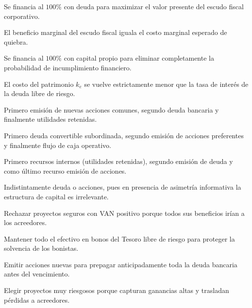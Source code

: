 \begin{opts}
    \item Se financia al $100\%$ con deuda para maximizar el valor presente del escudo fiscal corporativo.
    \item El beneficio marginal del escudo fiscal iguala el costo marginal esperado de quiebra.
    \item Se financia al $100\%$ con capital propio para eliminar completamente la probabilidad de incumplimiento financiero.
    \item El costo del patrimonio $k_e$ se vuelve estrictamente menor que la tasa de interés de la deuda libre de riesgo.
\end{opts}

\begin{opts}
    \item Primero emisión de nuevas acciones comunes, segundo deuda bancaria y finalmente utilidades retenidas.
    \item Primero deuda convertible subordinada, segundo emisión de acciones preferentes y finalmente flujo de caja operativo.
    \item Primero recursos internos (utilidades retenidas), segundo emisión de deuda y como último recurso emisión de acciones.
    \item Indistintamente deuda o acciones, pues en presencia de asimetría informativa la estructura de capital es irrelevante.
\end{opts}

\begin{opts}
    \item Rechazar proyectos seguros con VAN positivo porque todos sus beneficios irían a los acreedores.
    \item Mantener todo el efectivo en bonos del Tesoro libre de riesgo para proteger la solvencia de los bonistas.
    \item Emitir acciones nuevas para prepagar anticipadamente toda la deuda bancaria antes del vencimiento.
    \item Elegir proyectos muy riesgosos porque capturan ganancias altas y trasladan pérdidas a acreedores.
\end{opts}

